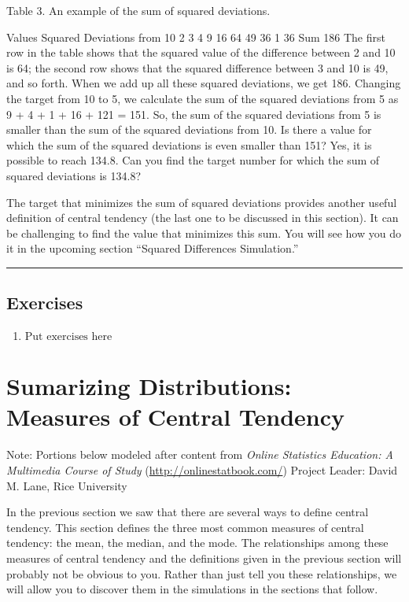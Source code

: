 \documentclass[
]{book}
\providecommand{\tightlist}{%
  \setlength{\itemsep}{0pt}\setlength{\parskip}{0pt}}
\begin{document}
Table 3. An example of the sum of squared deviations.

Values Squared Deviations
from 10
2
3
4
9
16 64
49
36
1
36
Sum 186
The first row in the table shows that the squared value of the difference between 2 and 10 is 64; the second row shows that the squared difference between 3 and 10 is 49, and so forth. When we add up all these squared deviations, we get 186. Changing the target from 10 to 5, we calculate the sum of the squared deviations from 5 as 9 + 4 + 1 + 16 + 121 = 151. So, the sum of the squared deviations from 5 is smaller than the sum of the squared deviations from 10. Is there a value for which the sum of the squared deviations is even smaller than 151? Yes, it is possible to reach 134.8. Can you find the target number for which the sum of squared deviations is 134.8?

The target that minimizes the sum of squared deviations provides another useful definition of central tendency (the last one to be discussed in this section). It can be challenging to find the value that minimizes this sum. You will see how you do it in the upcoming section ``Squared Differences Simulation.''

\begin{center}\rule{0.5\linewidth}{0.5pt}\end{center}

\hypertarget{exercises-6}{%
\section{Exercises}\label{exercises-6}}

\begin{enumerate}
\def\labelenumi{\arabic{enumi}.}
\tightlist
\item
  \(\text{Put exercises here}\)
\end{enumerate}

\hypertarget{sumarizing-distributions-measures-of-central-tendency}{%
\chapter{Sumarizing Distributions: Measures of Central Tendency}\label{sumarizing-distributions-measures-of-central-tendency}}

Note: Portions below modeled after content from
\emph{Online Statistics Education: A Multimedia Course of Study}
(\url{http://onlinestatbook.com/}) Project Leader: David M. Lane, Rice University

In the previous section we saw that there are several ways to define central tendency. This section defines the three most common measures of central tendency: the mean, the median, and the mode. The relationships among these measures of central tendency and the definitions given in the previous section will probably not be obvious to you. Rather than just tell you these relationships, we will allow you to discover them in the simulations in the sections that follow.
\end{document}
